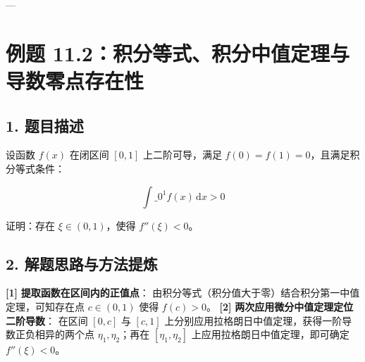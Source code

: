 \documentclass[11pt,a4paper,UTF8]{ctexart}
\begin{document}
---


\section{例题 11.2：积分等式、积分中值定理与导数零点存在性}


\subsection{1. 题目描述}
设函数 $f(x)$ 在闭区间 $[0, 1]$ 上二阶可导，满足 $f(0) = f(1) = 0$，且满足积分等式条件：

\begin{equation*}
\int\_0^1 f(x)\,\mathrm{d}x > 0
\end{equation*}

证明：存在 $\xi \in (0, 1)$，使得 $f''(\xi) < 0$。


\subsection{2. 解题思路与方法提炼}
\begin{solbox}[分步推导与答题规范]
\textbf{[1]}  \textbf{提取函数在区间内的正值点}：
由积分等式（积分值大于零）结合积分第一中值定理，可知存在点 $c \in (0, 1)$ 使得 $f(c) > 0$。
\textbf{[2]}  \textbf{两次应用微分中值定理定位二阶导数}：
在区间 $[0, c]$ 与 $[c, 1]$ 上分别应用拉格朗日中值定理，获得一阶导数正负相异的两个点 $\eta_1, \eta_2$；再在 $[\eta_1, \eta_2]$ 上应用拉格朗日中值定理，即可确定 $f''(\xi) < 0$。
\end{solbox}
\end{document}
